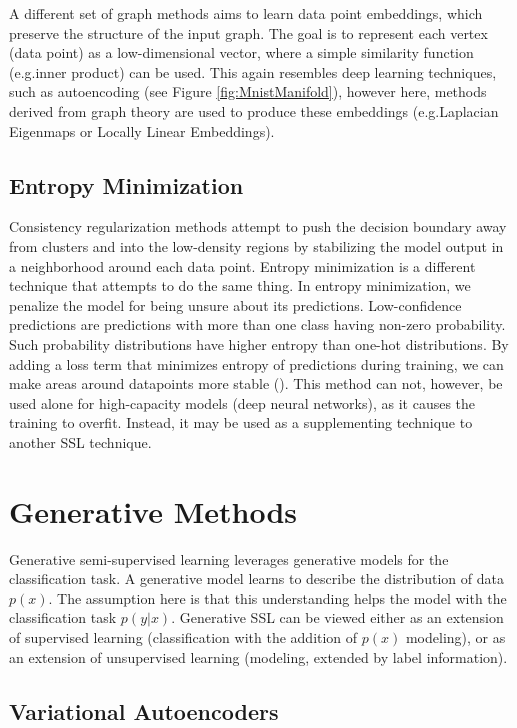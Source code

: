 A different set of graph methods aims to learn data point embeddings, which preserve the structure of the input graph. The goal is to represent each vertex (data point) as a low-dimensional vector, where a simple similarity function (e.g.\@ inner product) can be used. This again resembles deep learning techniques, such as autoencoding (see Figure \ref{fig:MnistManifold}), however here, methods derived from graph theory are used to produce these embeddings (e.g.\@ Laplacian Eigenmaps or Locally Linear Embeddings).


\subsection{Entropy Minimization}
\label{sec:EntropyMinimization}

Consistency regularization methods attempt to push the decision boundary away from clusters and into the low-density regions by stabilizing the model output in a neighborhood around each data point. Entropy minimization is a different technique that attempts to do the same thing. In entropy minimization, we penalize the model for being unsure about its predictions. Low-confidence predictions are predictions with more than one class having non-zero probability. Such probability distributions have higher entropy than one-hot distributions. By adding a loss term that minimizes entropy of predictions during training, we can make areas around datapoints more stable (\cite{EntropyMinimization}). This method can not, however, be used alone for high-capacity models (deep neural networks), as it causes the training to overfit. Instead, it may be used as a supplementing technique to another SSL technique.


\section{Generative Methods}
\label{sec:GenerativeSslMethods}

Generative semi-supervised learning leverages generative models for the classification task. A generative model learns to describe the distribution of data $p(x)$. The assumption here is that this understanding helps the model with the classification task $p(y|x)$. Generative SSL can be viewed either as an extension of supervised learning (classification with the addition of $p(x)$ modeling), or as an extension of unsupervised learning (modeling, extended by label information).


\subsection{Variational Autoencoders}

